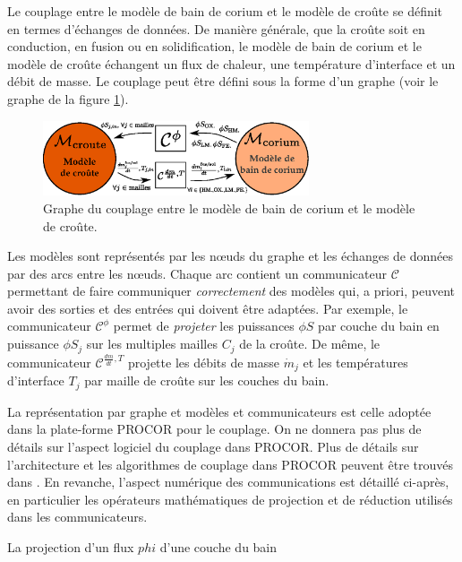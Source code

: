 Le couplage entre le modèle de bain de corium et le modèle de croûte se définit en termes d'échanges de données. De manière générale, que la croûte soit en conduction, en fusion ou en solidification, le modèle de bain de corium et le modèle de croûte échangent un flux de chaleur, une température d'interface et un débit de masse. Le couplage peut être défini sous la forme d'un graphe (voir le graphe de la figure \ref{fig:graphe_couplage_corium_croute}). 
\begin{figure}
\centering
\includegraphics[width=0.7\textwidth, keepaspectratio=true]{Figures/graphe_couplage_corium_croute.eps}
\caption{Graphe du couplage entre le modèle de bain de corium et le modèle de croûte.}
\label{fig:graphe_couplage_corium_croute}
\end{figure}
Les modèles sont représentés par les n\oe{}uds du graphe et les échanges de données par des arcs entre les n\oe{}uds. Chaque arc contient un communicateur $\mathcal{C}$ permettant de faire communiquer \emph{correctement} des modèles qui, a priori, peuvent avoir des sorties et des entrées qui doivent être adaptées. Par exemple, le communicateur $\mathcal{C}^{\phi}$ permet de \emph{projeter} les puissances $\phi S$ par couche du bain en puissance $\phi S_j$ sur les multiples mailles $C_j$ de la croûte. De même, le communicateur $\mathcal{C}^{\frac{dm}{dt}, T}$ projette les débits de masse $\dot{m}_j$ et les températures d'interface $T_j$ par maille de croûte sur les couches du bain. 

La représentation par graphe et modèles et communicateurs est celle adoptée dans la plate-forme PROCOR pour le couplage. On ne donnera pas plus de détails sur l'aspect logiciel du couplage dans PROCOR. Plus de détails sur l'architecture et les algorithmes de couplage dans PROCOR peuvent être trouvés dans \cite{Viot2018}. En revanche, l'aspect numérique des communications est détaillé ci-après, en particulier les opérateurs mathématiques de projection et de réduction utilisés dans les communicateurs.

La projection d'un flux $phi$ d'une couche du bain 
